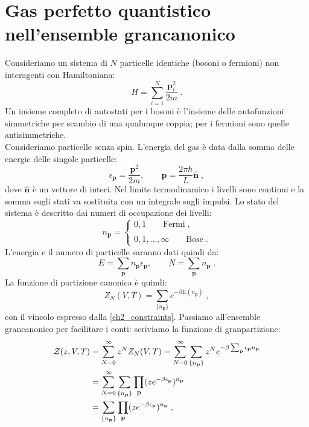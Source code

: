 \documentclass[10pt,a4paper]{report}
\theoremstyle{definition}
\numberwithin{equation}{section}
\newcommand{\zpart}{\mathcal{Z}}
\begin{document}
\section{Gas perfetto quantistico nell'ensemble grancanonico}
Consideriamo un sistema di $N$ particelle identiche (bosoni o fermioni) non interagenti con Hamiltoniana:
\begin{equation}
H=\sum_{i=1}^N\frac{\mathbf{p}_i^2}{2m}\;.
\end{equation}
Un insieme completo di autostati per i bosoni è l'insieme delle autofunzioni simmetriche per scambio di una qualunque coppia; per i fermioni sono quelle antisimmetriche. \\
Consideriamo particelle senza spin. L'energia del gas è data dalla somma delle energie delle singole particelle:
\begin{equation}
\epsilon_{\mathbf{p}}=\frac{\mathbf{p}^2}{2m},\qquad \mathbf{p}=\frac{2\pi \hbar}{L}\hat{\mathbf{n}}\;,
\end{equation}
dove $\hat{\mathbf{n}}$ è un vettore di interi. Nel limite termodinamico i livelli sono continui e la somma sugli stati va sostituita con un integrale sugli impulsi. Lo stato del sistema è descritto dai numeri di occupazione dei livelli:
\begin{equation}
n_{\mathbf{p}}=\begin{cases}
0,1\qquad \mbox{Fermi}\;, \\
\\
0,1,\ldots,\infty\qquad \mbox{Bose}\;.
\end{cases}
\end{equation}
L'energia e il numero di particelle saranno dati quindi da:
\begin{equation}
E=\sum_{\mathbf{p}}n_{\mathbf{p}}\epsilon_{\mathbf{p}},\qquad N=\sum_{\mathbf{p}}n_{\mathbf{p}}\;. \label{ch2_constraints}
\end{equation}
La funzione di partizione canonica è quindi:
\begin{equation}
Z_N(V,T)=\sum_{\{n_{\mathbf{p}}\}}e^{-\beta E(n_{\mathbf{p}})}\;,
\end{equation}
con il vincolo espresso dalla \eqref{ch2_constraints}. Passiamo all'ensemble grancanonico per facilitare i conti: scriviamo la funzione di granpartizione:
\begin{align}
\zpart(z,V,T) &= \sum_{N=0}^{\infty} z^NZ_N(V,T)=\sum_{N=0}^{\infty}\sum_{\{n_{\mathbf{p}}\}}z^Ne^{-\beta\sum_{\mathbf{p}}\epsilon_{\mathbf{p}}n_{\mathbf{p}}}\notag \\
&=\sum_{N=0}^{\infty}\sum_{\{n_{\mathbf{p}}\}}\prod_{\mathbf{p}}(ze^{-\beta\epsilon_{\mathbf{p}}})^{n_{\mathbf{p}}} \notag \\
&= \sum_{\{n_{\mathbf{p}}\}}\prod_{\mathbf{p}}(ze^{-\beta\epsilon_{\mathbf{p}}})^{n_{\mathbf{p}}}\;,
\end{align}
\end{document}

